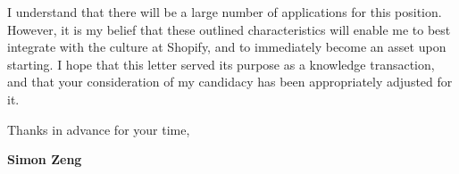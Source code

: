 \documentclass[12pt,a4paper,sans]{moderncv}        %
\begin{document}
I understand that there will be a large number of applications for this 
position. However, it is my belief that these outlined characteristics will 
enable me to best integrate with the culture at Shopify, and to immediately 
become an asset upon starting. I hope that this letter served its purpose as a 
knowledge transaction, and that your consideration of my candidacy has been 
appropriately adjusted for it.
\smallskip

Thanks in advance for your time,

\textbf{Simon Zeng}

\end{document}
